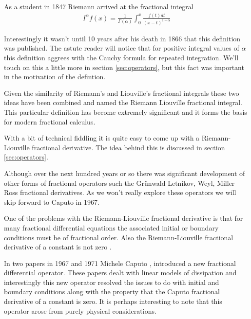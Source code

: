 As a student in 1847 Riemann arrived at the fractional integral
\begin{align}
	I^\alpha f(x) = \frac{1}{\Gamma(\alpha)} \int_0^x \frac{f(t)dt}{(x-t)^{1-\alpha}}
\end{align}

Interestingly it wasn't until 10 years after his death in 1866 that this definition was published. The astute reader will notice that for positive integral values of $ \alpha $ this definition aggrees with the Cauchy formula for repeated integration. We'll touch on this a little more in section \ref{sec:operators}, but this fact was important in the motivation of the defintion.

Given the similarity of Riemann's and Liouville's fractional integrals these two ideas have been combined and named the Riemann Liouville fractional integral. This particular definition has become extremely significant and it forms the basis for modern fractional calculus. 

With a bit of technical fiddling it is quite easy to come up with a Riemann-Liouville fractional derivative. The idea behind this is discussed in section \ref{sec:operators}.

Although over the next hundred years or so there was significant development of other forms of fractional operators such the Gr{\"u}nwald Letnikov, Weyl, Miller Ross fractional derivatives. As we won't really explore these operators we will skip forward to Caputo in 1967. 

One of the problems with the Riemann-Liouville fractional derivative is that for many fractional differential equations the associated initial or boundary conditions must be of fractional order. Also the Riemann-Liouville fractional derivative of a constant is not zero \cite{Podlubny1999}. 

In two papers in 1967 and 1971 Michele Caputo\cite{Caputo1967} \cite{Caputo1971}, introduced a new fractional differential operator. These papers dealt with linear models of dissipation and interestingly this new operator resolved the issues to do with initial and boundary conditions along with the property that the Caputo fractional derivative of a constant is zero. It is perhaps interesting to note that this operator arose from purely physical considerations. 

\clearpage
